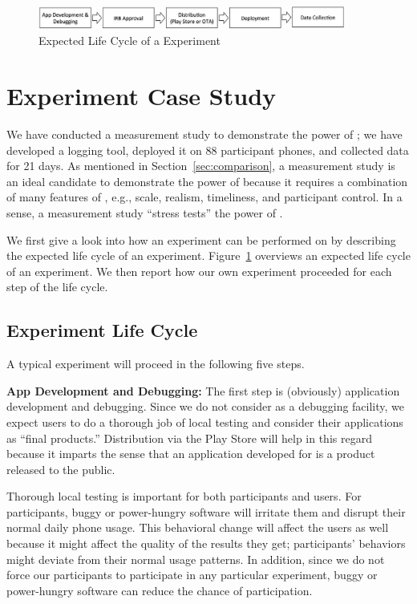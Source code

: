 \begin{figure}[t]
\centering
\includegraphics[width=0.9\textwidth]{experiment-life-cycle.pdf}
\caption{Expected Life Cycle of a \PhoneLab{} Experiment}
\label{fig:experiment-life-cycle}
\end{figure}

\section{Experiment Case Study}
\label{sec-experiment}

We have conducted a measurement study to demonstrate the power of \PhoneLab{};
we have developed a logging tool, deployed it on 88 participant phones, and
collected data for 21 days. As mentioned in Section~\ref{sec:comparison}, 
a measurement study is an ideal candidate to demonstrate the power of
\PhoneLab{} because it requires a combination of many features of \PhoneLab{},
e.g., scale, realism, timeliness, and participant control. In a sense, a
measurement study ``stress tests'' the power of \PhoneLab{}.

We first give a look into how an experiment can be performed on \PhoneLab{} by
describing the expected life cycle of an experiment.
Figure~\ref{fig:experiment-life-cycle} overviews an expected life cycle of an
experiment. We then report how our own experiment proceeded for each step of the
life cycle.

\subsection{Experiment Life Cycle}

A typical \PhoneLab{} experiment will proceed in the following five steps.

{\bf App Development and Debugging:} The first step is (obviously) application
development and debugging. Since we do not consider \PhoneLab{} as a debugging
facility, we expect \PhoneLab{} users to do a thorough job of local testing and
consider their applications as ``final products.'' Distribution via the Play
Store will help in this regard because it imparts the sense that an application
developed for \PhoneLab{} is a product released to the public.

Thorough local testing is important for both \PhoneLab{} participants and users.
For participants, buggy or power-hungry software will irritate them and disrupt
their normal daily phone usage. This behavioral change will affect the users as
well because it might affect the quality of the results they get; participants'
behaviors might deviate from their normal usage patterns. In addition, since we
do not force our participants to participate in any particular experiment, buggy
or power-hungry software can reduce the chance of participation.

